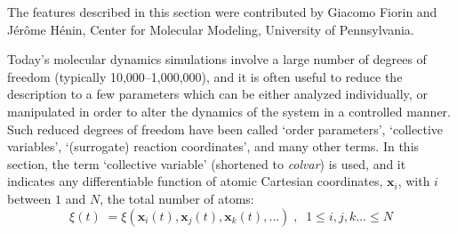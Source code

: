 
\label{section:colvars}

The features described in this section were contributed by
Giacomo Fiorin and J\'er\^ome H\'enin, Center for Molecular Modeling,
University of Pennsylvania.

Today's molecular dynamics simulations involve a large number of
degrees of freedom (typically 10,000--1,000,000), and it is often
useful to reduce the description to a few parameters which can be
either analyzed individually, or manipulated in order to alter the
dynamics of the system in a controlled manner.  Such reduced degrees
of freedom have been called `order parameters', `collective
variables', `(surrogate) reaction coordinates', and many other terms.
In this section, the term `collective variable' (shortened to
\textit{colvar}) is used, and it indicates any differentiable function
of atomic Cartesian coordinates, $\bm{x}_{i}$, with $i$ between
$1$ and $N$, the total number of atoms:
\begin{equation} 
  \label{eq:colvar_basic}
  \xi(t) \; = \xi\left(\bm{x}_{i}(t), \bm{x}_{j}(t), \bm{x}_{k}(t),
  \ldots \right)\;, \;\; 1 \leq i,j,k\ldots \leq N
\end{equation}

